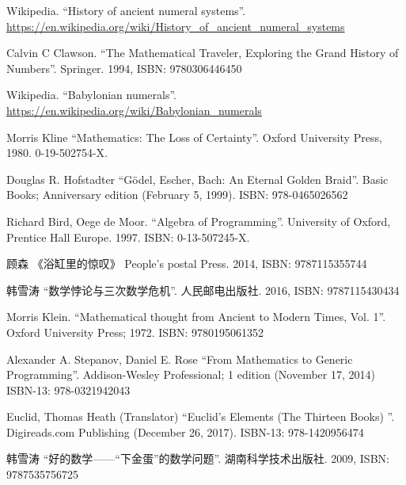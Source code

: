 \documentclass{article}
\begin{document}
\fi


\begin{thebibliography}{99}


Wikipedia. ``History of ancient numeral systems''. \url{https://en.wikipedia.org/wiki/History_of_ancient_numeral_systems}

Calvin C Clawson. ``The Mathematical Traveler, Exploring the Grand History of Numbers''. Springer. 1994, ISBN: 9780306446450

Wikipedia. ``Babylonian numerals''. \url{https://en.wikipedia.org/wiki/Babylonian_numerals}

Morris Kline ``Mathematics: The Loss of Certainty''. Oxford University Press, 1980. 0-19-502754-X.

Douglas R. Hofstadter ``Gödel, Escher, Bach: An Eternal Golden Braid''. Basic Books; Anniversary edition (February 5, 1999). ISBN: 978-0465026562

Richard Bird, Oege de Moor. ``Algebra of Programming''. University of Oxford, Prentice Hall Europe. 1997. ISBN: 0-13-507245-X.

{\fontspec{\cnmainft}顾森 《浴缸里的惊叹》} People's postal Press. 2014, ISBN: 9787115355744


{\fontspec{\cnmainft}韩雪涛 ``数学悖论与三次数学危机''. 人民邮电出版社. 2016, ISBN: 9787115430434}

Morris Klein. ``Mathematical thought from Ancient to Modern Times, Vol. 1''. Oxford University Press; 1972. ISBN: 9780195061352

Alexander A. Stepanov, Daniel E. Rose ``From Mathematics to Generic Programming''. Addison-Wesley Professional; 1 edition (November 17, 2014) ISBN-13: 978-0321942043

Euclid, Thomas Heath (Translator) ``Euclid's Elements (The Thirteen Books) ''. Digireads.com Publishing (December 26, 2017). ISBN-13: 978-1420956474

{\fontspec{\cnmainft}韩雪涛 ``好的数学——“下金蛋”的数学问题''. 湖南科学技术出版社. 2009, ISBN: 9787535756725}


\end{thebibliography}
\end{document}
